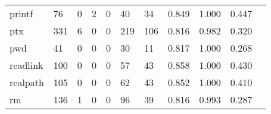 \begin{longtable}{lp{1.2cm}p{1.2cm}p{1.2cm}p{1.2cm}p{1.2cm}p{1.2cm}p{1.2cm}p{1.2cm}p{1.2cm}p{1.2cm}}
printf    &                                    76 &                                                  0 &                                                  2 &                                                  0 &                                                 40 &                                                 34 &                                              0.849 &                                              1.000 &                                              0.447 \\
ptx       &                                   331 &                                                  6 &                                                  0 &                                                  0 &                                                219 &                                                106 &                                              0.816 &                                              0.982 &                                              0.320 \\
pwd       &                                    41 &                                                  0 &                                                  0 &                                                  0 &                                                 30 &                                                 11 &                                              0.817 &                                              1.000 &                                              0.268 \\
readlink  &                                   100 &                                                  0 &                                                  0 &                                                  0 &                                                 57 &                                                 43 &                                              0.858 &                                              1.000 &                                              0.430 \\
realpath  &                                   105 &                                                  0 &                                                  0 &                                                  0 &                                                 62 &                                                 43 &                                              0.852 &                                              1.000 &                                              0.410 \\
rm        &                                   136 &                                                  1 &                                                  0 &                                                  0 &                                                 96 &                                                 39 &                                              0.816 &                                              0.993 &                                              0.287 \\

\end{longtable}
